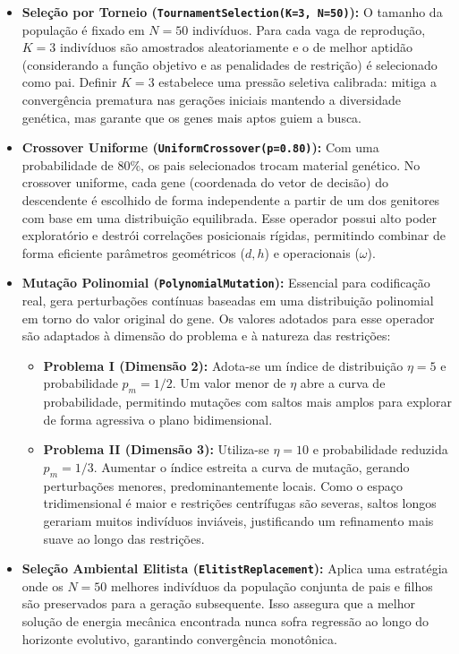 \documentclass[a4paper, 12pt]{article}%
\begin{document}
\begin{itemize}
    \item \textbf{Seleção por Torneio (\texttt{TournamentSelection(K=3, N=50)}):} O tamanho da população é fixado em $N=50$ indivíduos. Para cada vaga de reprodução, $K=3$ indivíduos são amostrados aleatoriamente e o de melhor aptidão (considerando a função objetivo e as penalidades de restrição) é selecionado como pai. Definir $K=3$ estabelece uma pressão seletiva calibrada: mitiga a convergência prematura nas gerações iniciais mantendo a diversidade genética, mas garante que os genes mais aptos guiem a busca.
    \item \textbf{Crossover Uniforme (\texttt{UniformCrossover(p=0.80)}):} Com uma probabilidade de $80\%$, os pais selecionados trocam material genético. No crossover uniforme, cada gene (coordenada do vetor de decisão) do descendente é escolhido de forma independente a partir de um dos genitores com base em uma distribuição equilibrada. Esse operador possui alto poder exploratório e destrói correlações posicionais rígidas, permitindo combinar de forma eficiente parâmetros geométricos ($d, h$) e operacionais ($\omega$).
    \item \textbf{Mutação Polinomial (\texttt{PolynomialMutation}):} Essencial para codificação real, gera perturbações contínuas baseadas em uma distribuição polinomial em torno do valor original do gene. Os valores adotados para esse operador são adaptados à dimensão do problema e à natureza das restrições:
    \begin{itemize}
        \item \textbf{Problema I (Dimensão 2):} Adota-se um índice de distribuição $\eta=5$ e probabilidade $p_m=1/2$. Um valor menor de $\eta$ abre a curva de probabilidade, permitindo mutações com saltos mais amplos para explorar de forma agressiva o plano bidimensional.
        \item \textbf{Problema II (Dimensão 3):} Utiliza-se $\eta=10$ e probabilidade reduzida $p_m=1/3$. Aumentar o índice estreita a curva de mutação, gerando perturbações menores, predominantemente locais. Como o espaço tridimensional é maior e restrições centrífugas são severas, saltos longos gerariam muitos indivíduos inviáveis, justificando um refinamento mais suave ao longo das restrições.
    \end{itemize}
    \item \textbf{Seleção Ambiental Elitista (\texttt{ElitistReplacement}):} Aplica uma estratégia onde os $N=50$ melhores indivíduos da população conjunta de pais e filhos são preservados para a geração subsequente. Isso assegura que a melhor solução de energia mecânica encontrada nunca sofra regressão ao longo do horizonte evolutivo, garantindo convergência monotônica.
\end{itemize}
\end{document}
